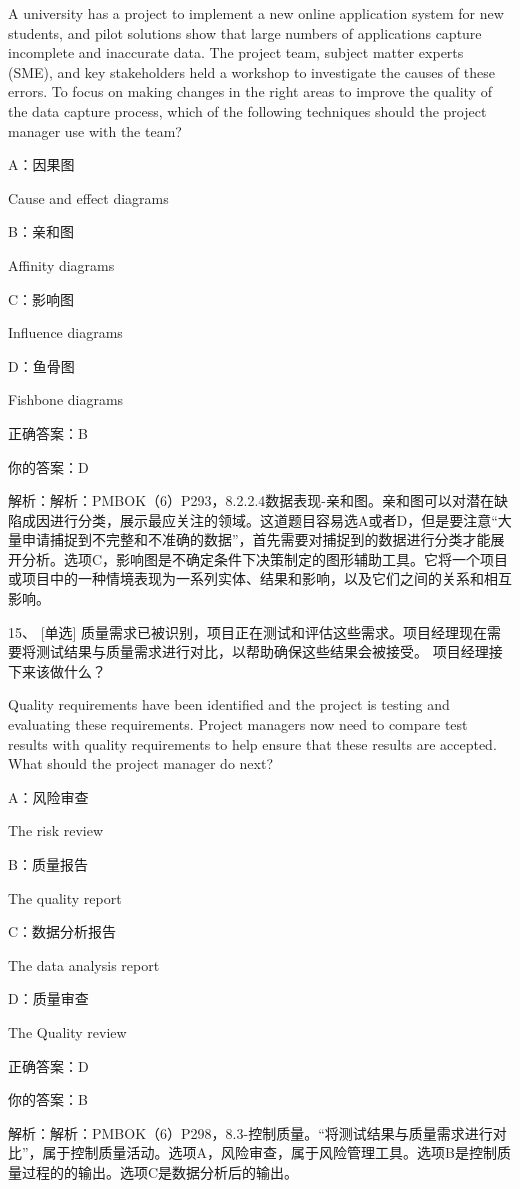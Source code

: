 A university has a project to implement a new online application system for new students, and pilot solutions show that large numbers of applications capture incomplete and inaccurate data. The project team, subject matter experts (SME), and key stakeholders held a workshop to investigate the causes of these errors. To focus on making changes in the right areas to improve the quality of the data capture process, which of the following techniques should the project manager use with the team?

A：因果图

Cause and effect diagrams

B：亲和图

Affinity diagrams

C：影响图

Influence diagrams

D：鱼骨图

Fishbone diagrams

正确答案：B

你的答案：D

解析：解析：PMBOK（6）P293，8.2.2.4数据表现-亲和图。亲和图可以对潜在缺陷成因进行分类，展示最应关注的领域。这道题目容易选A或者D，但是要注意“大量申请捕捉到不完整和不准确的数据”，首先需要对捕捉到的数据进行分类才能展开分析。选项C，影响图是不确定条件下决策制定的图形辅助工具。它将一个项目或项目中的一种情境表现为一系列实体、结果和影响，以及它们之间的关系和相互影响。


15、 [单选] 质量需求已被识别，项目正在测试和评估这些需求。项目经理现在需要将测试结果与质量需求进行对比，以帮助确保这些结果会被接受。 项目经理接下来该做什么？

Quality requirements have been identified and the project is testing and evaluating these requirements. Project managers now need to compare test results with quality requirements to help ensure that these results are accepted. What should the project manager do next?

A：风险审查

The risk review

B：质量报告

The quality report

C：数据分析报告

The data analysis report

D：质量审查

The Quality review

正确答案：D

你的答案：B

解析：解析：PMBOK（6）P298，8.3-控制质量。“将测试结果与质量需求进行对比”，属于控制质量活动。选项A，风险审查，属于风险管理工具。选项B是控制质量过程的的输出。选项C是数据分析后的输出。


